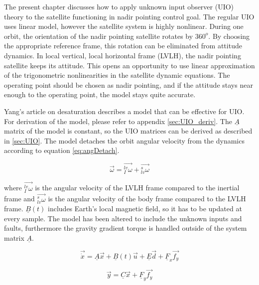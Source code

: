 The present chapter discusses how to apply unknown input observer (UIO) theory to the satellite functioning in nadir pointing control goal. The regular UIO uses linear model, however the satellite system is highly nonlinear.  During one orbit, the orientation of the nadir pointing satellite rotates by $360^o$. By choosing the appropriate reference frame, this rotation can be eliminated from attitude dynamics. In local vertical, local horizontal frame (LVLH), the nadir pointing satellite keeps its attitude. This opens an opportunity to use linear approximation of the trigonometric nonlinearities in the satellite dynamic equations. The operating point should be chosen as nadir pointing, and if the attitude stays near enough to the operating point, the model stays quite accurate.


Yang's article on desaturation \cite{DesatYang} describes a model that can be effective for UIO. For derivation of the model, please refer to appendix \ref{sec:UIO_deriv}. The $\underline{A}$ matrix of the model is constant, so the UIO matrices can be derived as described in \ref{sec:UIO}. The model detaches the orbit angular velocity from the dynamics according to equation \ref{eq:angDetach}.

\begin{equation}
\label{eq:angDetach}
\vec{\omega} = \vec{_I^{lv}\omega} + \vec{_{lv}^s\omega}
\end{equation}

where $\vec{_I^{lv}\omega}$ is the angular velocity of the LVLH frame compared to the inertial frame and $\vec{_{lv}^s\omega}$ is the angular velocity of the body frame compared to the LVLH frame. $\underline{B}(t)$ includes Earth's local magnetic field, so it has to be updated at every sample. The model has been altered to include the unknown inputs and faults, furthermore the gravity gradient torque is handled outside of the system matrix $\underline{A}$.

\begin{equation}
\vec{\dot{x}} =
\underline{A}\vec{x} + \underline{B}(t)\vec{u} + \underline{E} \vec{d} + \underline{F}_x \vec{f_y} 
\label{eq:uioagain}
\end{equation}

\begin{equation}
\vec{y} =
\underline{C}\vec{x} + \underline{F}_y \vec{f_y} 
\label{eq:uioagain2}
\end{equation}

